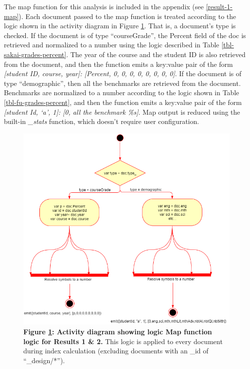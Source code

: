 The map function for this analysis is included in  the appendix (see \ref{result-1-map}). Each document passed to the map function is treated according to the logic shown in the activity diagram in Figure \ref{result-1-map-fn}. That is, a document's type is checked. If the document is of type ``courseGrade'', the Percent field of the doc is retrieved and normalized to a number using the logic described in Table \ref{tbl-sakai-grades-percent}. The year of the course and the student ID is also retrieved from the document, and then the function emits a key:value pair of the form \textit{[student ID, course, year]: [Percent, 0, 0, 0, 0, 0, 0, 0, 0]}. If the document is of type ``demographic'', then all the benchmarks are retrieved from the document. Benchmarks are normalized to a number according to the logic shown in Table  \ref{tbl-fu-grades-percent}, and then the function emits a key:value pair of the form \textit{[student Id, `a', 1]: [0, all the benchmark \%s]}. Map output is reduced using the built-in \textit{\_stats} function, which doesn't require user configuration.

\begin{figure}[ht]
    \centering
    \begin{mdframed}
        \centering
        \includegraphics[scale=0.35]{./resources/figures/activity-diagram-1.png}
    \end{mdframed}
    \caption[Result 1 Map function]{\textbf{Figure \ref{result-1-map-fn}: Activity diagram showing logic Map function logic for Results 1 \& 2.} This logic is applied to every document during index calculation (excluding documents with an \_id of ``\_design/*'').}
    \label{result-1-map-fn}
\end{figure}

